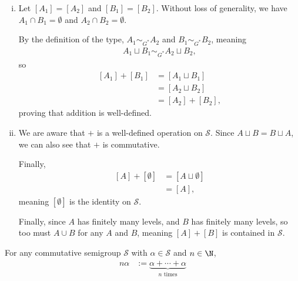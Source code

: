 \documentclass[10pt]{mypackage}
\begin{document}
  \begin{solution}\hfill
    \begin{enumerate}[(i)]
      \item Let $\left[A_1\right] = \left[A_2\right]$ and $\left[B_1\right] = \left[B_2\right]$. Without loss of generality, we have $A_1\cap B_1 = \emptyset$ and $A_2\cap B_2 = \emptyset$.\newline

        By the definition of the type, $A_1\sim_{G^{\ast}}A_2$ and $B_1\sim_{G^{\ast}}B_2$, meaning
        \begin{align*}
          A_1\sqcup B_1 \sim_{G^{\ast}}A_2\sqcup B_2,
        \end{align*}
        so
        \begin{align*}
          \left[A_1\right] + \left[B_1\right] &= \left[A_1\sqcup B_1\right]\\
                                              &= \left[A_2\sqcup B_2\right]\\
                                              &= \left[A_2\right] + \left[B_2\right],
        \end{align*}
        proving that addition is well-defined.
      \item We are aware that $+$ is a well-defined operation on $\mathcal{S}$. Since $A\sqcup B = B\sqcup A$, we can also see that $+$ is commutative.\newline

        Finally,
        \begin{align*}
          \left[A\right] + \left[\emptyset\right] &= \left[A\sqcup \emptyset\right]\\
                                                  &= \left[A\right],
        \end{align*}
        meaning $\left[\emptyset\right]$ is the identity on $\mathcal{S}$.\newline

        Finally, since $A$ has finitely many levels, and $B$ has finitely many levels, so too must $A\cup B$ for any $A$ and $B$, meaning $\left[A\right] + \left[B\right]$ is contained in $\mathcal{S}$.
    \end{enumerate}
  \end{solution}
  \begin{definition}
    For any commutative semigroup $\mathcal{S}$ with $\alpha \in \mathcal{S}$ and $n\in \N$,
    \begin{align*}
      n\alpha &:= \underbrace{\alpha + \cdots + \alpha}_{n\text{ times}}
    \end{align*}
  \end{definition}
\end{document}
